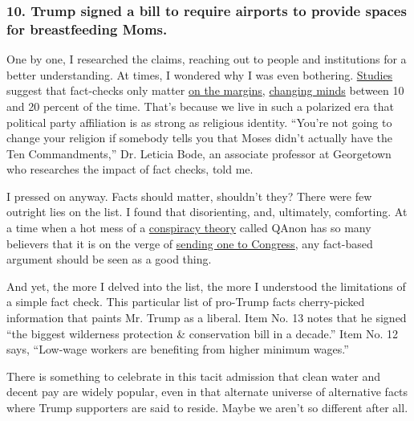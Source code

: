 \hypertarget{10-trump-signed-a-bill-to-require-airports-to-provide-spaces-for-breastfeeding-moms}{%
\subsubsection{10. Trump signed a bill to require airports to provide
spaces for breastfeeding
Moms.}\label{10-trump-signed-a-bill-to-require-airports-to-provide-spaces-for-breastfeeding-moms}}

One by one, I researched the claims, reaching out to people and
institutions for a better understanding. At times, I wondered why I was
even bothering.
\href{https://journals.sagepub.com/doi/abs/10.1177/1075547017731776}{Studies}
suggest that fact-checks only matter
\href{https://www.tandfonline.com/doi/abs/10.1080/1369118X.2017.1313883}{on
the margins},
\href{https://misinforeview.hks.harvard.edu/article/do-the-right-thing-tone-may-not-affect-correction-of-misinformation-on-social-media/}{changing
minds} between 10 and 20 percent of the time. That's because we live in
such a polarized era that political party affiliation is as strong as
religious identity. ``You're not going to change your religion if
somebody tells you that Moses didn't actually have the Ten
Commandments,'' Dr. Leticia Bode, an associate professor at Georgetown
who researches the impact of fact checks, told me.

I pressed on anyway. Facts should matter, shouldn't they? There were few
outright lies on the list. I found that disorienting, and, ultimately,
comforting. At a time when a hot mess of a
\href{https://www.nytimes3xbfgragh.onion/2020/08/27/opinion/trump-rnc-conspiracy-theories.html}{conspiracy
theory} called QAnon has so many believers that it is on the verge of
\href{https://www.nytimes3xbfgragh.onion/2020/08/12/us/politics/a-qanon-supporter-is-almost-definitely-heading-to-congress.html}{sending
one to Congress}, any fact-based argument should be seen as a good
thing.

And yet, the more I delved into the list, the more I understood the
limitations of a simple fact check. This particular list of pro-Trump
facts cherry-picked information that paints Mr. Trump as a liberal. Item
No. 13 notes that he signed ``the biggest wilderness protection \&
conservation bill in a decade.'' Item No. 12 says, ``Low-wage workers
are benefiting from higher minimum wages.''

There is something to celebrate in this tacit admission that clean water
and decent pay are widely popular, even in that alternate universe of
alternative facts where Trump supporters are said to reside. Maybe we
aren't so different after all.

